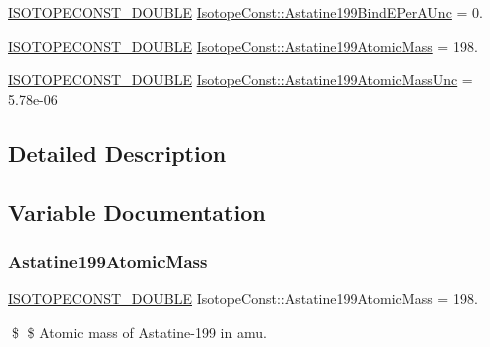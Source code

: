 \begin{DoxyCompactItemize}
\mbox{\hyperlink{group___isotope_const-_macros_ga8f45a7272ce02c0b4c65c44636ed719a}{I\+S\+O\+T\+O\+P\+E\+C\+O\+N\+S\+T\+\_\+\+D\+O\+U\+B\+LE}} \mbox{\hyperlink{group___isotope_const-_astatine-_at199_gad5e9d62a5e480b4821f3860af3c6070c}{Isotope\+Const\+::\+Astatine199\+Bind\+E\+Per\+A\+Unc}} = 0.
\item 
\mbox{\hyperlink{group___isotope_const-_macros_ga8f45a7272ce02c0b4c65c44636ed719a}{I\+S\+O\+T\+O\+P\+E\+C\+O\+N\+S\+T\+\_\+\+D\+O\+U\+B\+LE}} \mbox{\hyperlink{group___isotope_const-_astatine-_at199_ga6da9cdeb880c2e96cddeaa2e729c83e7}{Isotope\+Const\+::\+Astatine199\+Atomic\+Mass}} = 198.
\item 
\mbox{\hyperlink{group___isotope_const-_macros_ga8f45a7272ce02c0b4c65c44636ed719a}{I\+S\+O\+T\+O\+P\+E\+C\+O\+N\+S\+T\+\_\+\+D\+O\+U\+B\+LE}} \mbox{\hyperlink{group___isotope_const-_astatine-_at199_gad1e3495296fa56467705c8a1e833dda5}{Isotope\+Const\+::\+Astatine199\+Atomic\+Mass\+Unc}} = 5.\+78e-\/06
\end{DoxyCompactItemize}


\subsection{Detailed Description}


\subsection{Variable Documentation}
\mbox{\label{group___isotope_const-_astatine-_at199_ga6da9cdeb880c2e96cddeaa2e729c83e7}} 
\subsubsection{\texorpdfstring{Astatine199\+Atomic\+Mass}{Astatine199AtomicMass}}
{\footnotesize\ttfamily \mbox{\hyperlink{group___isotope_const-_macros_ga8f45a7272ce02c0b4c65c44636ed719a}{I\+S\+O\+T\+O\+P\+E\+C\+O\+N\+S\+T\+\_\+\+D\+O\+U\+B\+LE}} Isotope\+Const\+::\+Astatine199\+Atomic\+Mass = 198.}

\$ \$ Atomic mass of Astatine-\/199 in amu. \mbox{\label{group___isotope_const-_astatine-_at199_gad1e3495296fa56467705c8a1e833dda5}} 
